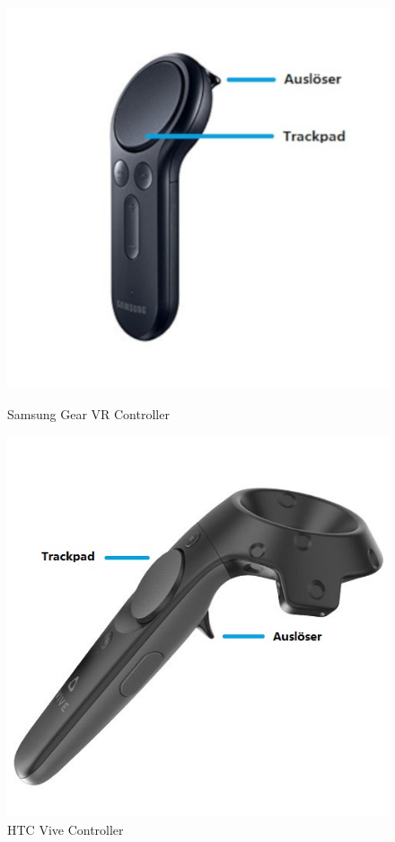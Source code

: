   \begin{figure}[ht]
   \begin{minipage}[t]{0.48\linewidth}
   \centering
   \includegraphics[width=\textwidth]{images/GearVRController.png}
   \caption[Skillslab WebVR]{Samsung Gear VR Controller}
   \end{minipage}
   \hspace{0.5cm}
   \begin{minipage}[t]{0.48\linewidth}
   \includegraphics[width=\textwidth]{images/ViveController.jpg}
   \caption[Skillslab WebVR]{HTC Vive Controller}
   \end{minipage}
  \end{figure}
  
